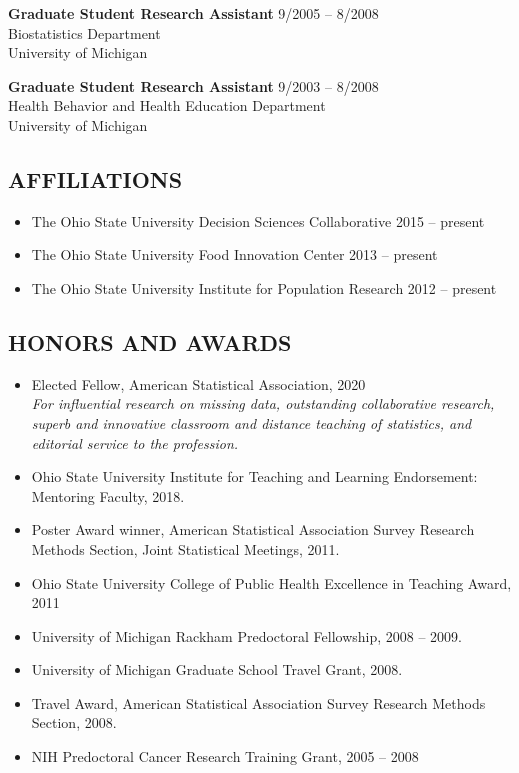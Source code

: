 \documentclass[
  english,
  letterpaper,
  DIV=11,
  numbers=noendperiod]{scrartcl}
\providecommand{\tightlist}{%
  \setlength{\itemsep}{0pt}\setlength{\parskip}{0pt}}
\begin{document}
\textbf{Graduate Student Research Assistant} {9/2005 -- 8/2008}\\
Biostatistics Department\\
University of Michigan

\textbf{Graduate Student Research Assistant} {9/2003 -- 8/2008}\\
Health Behavior and Health Education Department\\
University of Michigan

\subsection{AFFILIATIONS}\label{affiliations}

\begin{itemize}
\tightlist
\item
  The Ohio State University Decision Sciences Collaborative {2015 --
  present}
\item
  The Ohio State University Food Innovation Center {2013 -- present}
\item
  The Ohio State University Institute for Population Research {2012 --
  present}
\end{itemize}

\subsection{HONORS AND AWARDS}\label{honors-and-awards}

\begin{itemize}
\tightlist
\item
  Elected Fellow, American Statistical Association, 2020\\
  \emph{For influential research on missing data, outstanding
  collaborative research, superb and innovative classroom and distance
  teaching of statistics, and editorial service to the profession.}
\item
  Ohio State University Institute for Teaching and Learning Endorsement:
  Mentoring Faculty, 2018.
\item
  Poster Award winner, American Statistical Association Survey Research
  Methods Section, Joint Statistical Meetings, 2011.
\item
  Ohio State University College of Public Health Excellence in Teaching
  Award, 2011
\item
  University of Michigan Rackham Predoctoral Fellowship, 2008 -- 2009.
\item
  University of Michigan Graduate School Travel Grant, 2008.
\item
  Travel Award, American Statistical Association Survey Research Methods
  Section, 2008.
\item
  NIH Predoctoral Cancer Research Training Grant, 2005 -- 2008
\end{itemize}
\end{document}

